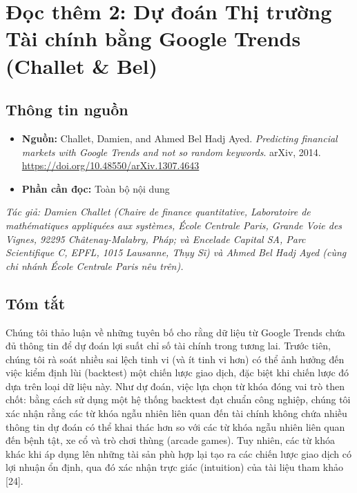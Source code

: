 \chapter{Đọc thêm 2: Dự đoán Thị trường Tài chính bằng Google Trends (Challet \& Bel)}
\label{ch:M4L2DT2}


\section{Thông tin nguồn}

\begin{itemize}
  \item \textbf{Nguồn:} Challet, Damien, and Ahmed Bel Hadj Ayed. \emph{Predicting financial markets with Google Trends and not so random keywords}. arXiv, 2014. \url{https://doi.org/10.48550/arXiv.1307.4643}
  \item \textbf{Phần cần đọc:} Toàn bộ nội dung
\end{itemize}

\bigskip

\noindent\textit{Tác giả: Damien Challet (Chaire de finance quantitative, Laboratoire de mathématiques appliquées aux systèmes, École Centrale Paris, Grande Voie des Vignes, 92295 Châtenay-Malabry, Pháp; và Encelade Capital SA, Parc Scientifique C, EPFL, 1015 Lausanne, Thụy Sĩ) và Ahmed Bel Hadj Ayed (cùng chi nhánh École Centrale Paris nêu trên).}

\section{Tóm tắt}

Chúng tôi thảo luận về những tuyên bố cho rằng dữ liệu từ Google Trends chứa đủ thông tin để dự đoán lợi suất chỉ số tài chính trong tương lai. Trước tiên, chúng tôi rà soát nhiều sai lệch tinh vi (và ít tinh vi hơn) có thể ảnh hưởng đến việc kiểm định lùi (backtest) một chiến lược giao dịch, đặc biệt khi chiến lược đó dựa trên loại dữ liệu này. Như dự đoán, việc lựa chọn từ khóa đóng vai trò then chốt: bằng cách sử dụng một hệ thống backtest đạt chuẩn công nghiệp, chúng tôi xác nhận rằng các từ khóa ngẫu nhiên liên quan đến tài chính không chứa nhiều thông tin dự đoán có thể khai thác hơn so với các từ khóa ngẫu nhiên liên quan đến bệnh tật, xe cổ và trò chơi thùng (arcade games). Tuy nhiên, các từ khóa khác khi áp dụng lên những tài sản phù hợp lại tạo ra các chiến lược giao dịch có lợi nhuận ổn định, qua đó xác nhận trực giác (intuition) của tài liệu tham khảo [24].

